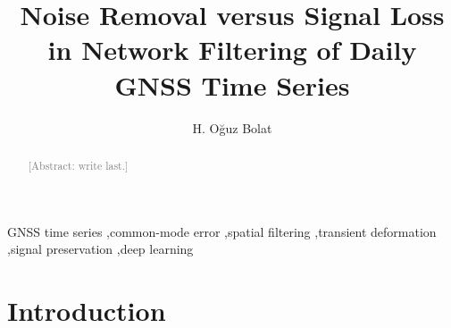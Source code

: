 \documentclass[preprint,12pt,authoryear]{elsarticle}
\newcommand{\towrite}[1]{\textcolor{gray}{[#1]}}
\begin{document}
\begin{frontmatter}

  \title{Noise Removal versus Signal Loss in Network Filtering of Daily GNSS Time Series}

  \author{H. O\u{g}uz Bolat}

  \begin{abstract}
    \towrite{Abstract: write last.}
  \end{abstract}

  \begin{keyword}
    GNSS time series \sep common-mode error \sep spatial filtering \sep transient deformation \sep signal preservation \sep deep learning
  \end{keyword}

\end{frontmatter}

\section{Introduction}
\label{sec:intro}
\end{document}
